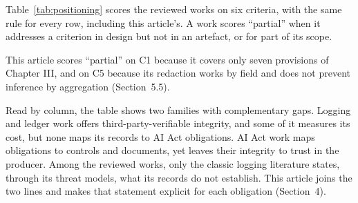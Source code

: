 Table~\ref{tab:positioning} scores the reviewed works on six criteria, with the same rule for every row, including this article's. A work scores ``partial'' when it addresses a criterion in design but not in an artefact, or for part of its scope.



This article scores ``partial'' on C1 because it covers only seven provisions of Chapter III, and on C5 because its redaction works by field and does not prevent inference by aggregation (Section~5.5).

Read by column, the table shows two families with complementary gaps. Logging and ledger work offers third-party-verifiable integrity, and some of it measures its cost, but none maps its records to AI Act obligations. AI Act work maps obligations to controls and documents, yet leaves their integrity to trust in the producer. Among the reviewed works, only the classic logging literature states, through its threat models, what its records do not establish. This article joins the two lines and makes that statement explicit for each obligation (Section~4).
